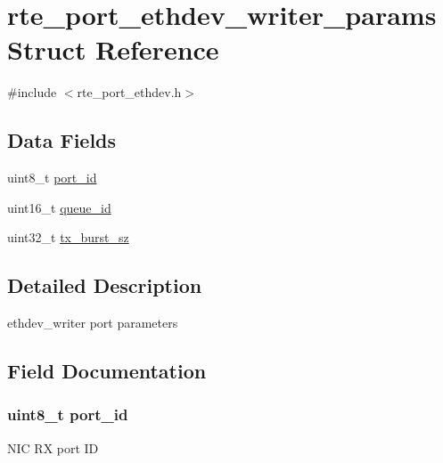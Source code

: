 \hypertarget{structrte__port__ethdev__writer__params}{}\section{rte\+\_\+port\+\_\+ethdev\+\_\+writer\+\_\+params Struct Reference}
\label{structrte__port__ethdev__writer__params}


{\ttfamily \#include $<$rte\+\_\+port\+\_\+ethdev.\+h$>$}

\subsection*{Data Fields}
\begin{DoxyCompactItemize}
\item 
uint8\+\_\+t \hyperlink{structrte__port__ethdev__writer__params_aae6814cc8987b1899b9d94cb621857c3}{port\+\_\+id}
\item 
uint16\+\_\+t \hyperlink{structrte__port__ethdev__writer__params_ad36dd41501a26e3cc7590d1d9a62cdb9}{queue\+\_\+id}
\item 
uint32\+\_\+t \hyperlink{structrte__port__ethdev__writer__params_a9ed7dbe6241b97c9b68a9491e77c84d0}{tx\+\_\+burst\+\_\+sz}
\end{DoxyCompactItemize}


\subsection{Detailed Description}
ethdev\+\_\+writer port parameters 

\subsection{Field Documentation}
\hypertarget{structrte__port__ethdev__writer__params_aae6814cc8987b1899b9d94cb621857c3}{}
\subsubsection[{port\+\_\+id}]{\setlength{\rightskip}{0pt plus 5cm}uint8\+\_\+t port\+\_\+id}\label{structrte__port__ethdev__writer__params_aae6814cc8987b1899b9d94cb621857c3}
N\+I\+C R\+X port I\+D \hypertarget{structrte__port__ethdev__writer__params_ad36dd41501a26e3cc7590d1d9a62cdb9}{}
